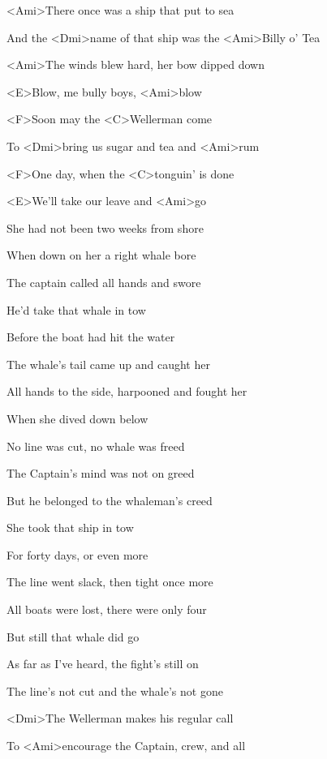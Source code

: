 

\zs
<Ami>There once was a ship that put to sea

And the <Dmi>name of that ship was the <Ami>Billy o' Tea

<Ami>The winds blew hard, her bow dipped down

<E>Blow, me bully boys, <Ami>blow
\ks

\zr
<F>Soon may the <C>Wellerman come

To <Dmi>bring us sugar and tea and <Ami>rum

<F>One day, when the <C>tonguin' is done

<E>We'll take our leave and <Ami>go
\kr

\zs
She had not been two weeks from shore

When down on her a right whale bore

The captain called all hands and swore

He'd take that whale in tow
\ks

\zr \kr

\zs
Before the boat had hit the water

The whale's tail came up and caught her

All hands to the side, harpooned and fought her

When she dived down below
\ks

\zr \kr

\zs
No line was cut, no whale was freed

The Captain's mind was not on greed

But he belonged to the whaleman's creed

She took that ship in tow
\ks

\zr \kr

\zs
For forty days, or even more

The line went slack, then tight once more

All boats were lost, there were only four

But still that whale did go
\ks

\zr \kr

\zs
As far as I've heard, the fight's still on

The line's not cut and the whale's not gone

<Dmi>The Wellerman makes his regular call

To <Ami>encourage the Captain, crew, and all
\ks

\zr \kr

\zr \kr

\kp
